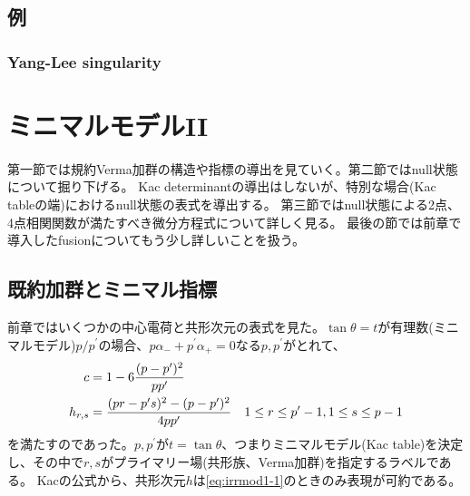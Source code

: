 \documentclass[11pt, aps, longbibliography]{article}
\numberwithin{equation}{section}
\begin{document}
    \subsection{例}
        \subsubsection{Yang-Lee singularity}
    
    \newpage 
    
    \section{ミニマルモデルII}
    第一節では規約Verma加群の構造や指標の導出を見ていく。第二節ではnull状態について掘り下げる。
    Kac determinantの導出はしないが、特別な場合(Kac tableの端)におけるnull状態の表式を導出する。
    第三節ではnull状態による2点、4点相関関数が満たすべき微分方程式について詳しく見る。
    最後の節では前章で導入したfusionについてもう少し詳しいことを扱う。
    
    \subsection{既約加群とミニマル指標}
    前章ではいくつかの中心電荷と共形次元の表式を見た。$\tan \theta = t$が有理数(ミニマルモデル)$p/p^\prime$の場合、$p\alpha_- + p^\prime \alpha_+=0$なる$p,p^\prime$がとれて、
    \begin{align}\label{eq:irrmod1-1}
        c &= 1-6\frac{(p-p^\prime)^2}{pp^\prime} \\
        h_{r,s} &= \frac{(pr-p^\prime s)^2-(p-p^\prime)^2}{4pp^\prime} \quad 1\leq r \leq p^\prime-1, 1\leq s \leq p-1 \notag 
    \end{align}
    を満たすのであった。$p,p^\prime$が$t = \tan \theta$、つまりミニマルモデル(Kac table)を決定し、その中で$r,s$がプライマリー場(共形族、Verma加群)を指定するラベルである。
    Kacの公式から、共形次元$h$は\eqref{eq:irrmod1-1}のときのみ表現が可約である。
\end{document}
